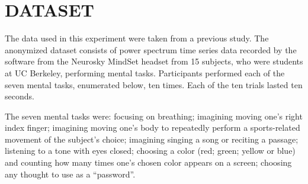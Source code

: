 
\section{\uppercase{Dataset}}

The data used in this experiment were taken from a previous study. \cite{adams_i_2013} The anonymized dataset consists of power spectrum time series data recorded by the software from the Neurosky MindSet headset from 15 subjects, who were students at UC Berkeley, performing mental tasks. Participants performed each of the seven mental tasks, enumerated below, ten times. Each of the ten trials lasted ten seconds.

The seven mental tasks were: focusing on breathing; imagining moving one's right index finger; imagining moving one's body to repeatedly perform a sports-related movement of the subject's choice; imagining singing a song or reciting a passage; listening to a tone with eyes closed; choosing a color (red; green; yellow or blue) and counting how many times one's chosen color appears on a screen; choosing any thought to use as a ``password''.
